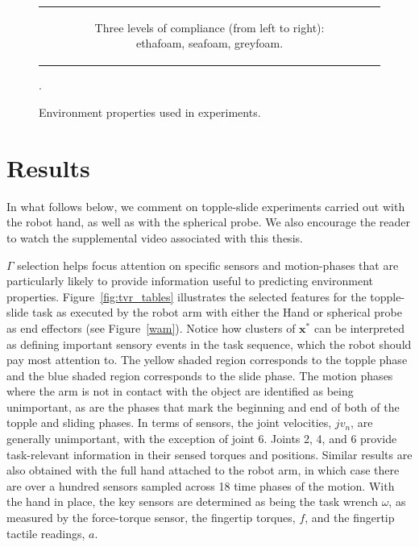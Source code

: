 \begin{figure}[]
\begin{tabular}{c}
\begin{subfigure}[]{1\linewidth}
            \caption{Three levels of compliance (from left to right): ethafoam, seafoam, greyfoam.}
        \end{subfigure}
    \end{tabular}
    \caption{Environment properties used in experiments.}.
    \label{fig:vis_properties}
\end{figure}

\section{Results}
In what follows below, we comment on topple-slide experiments carried out with the robot hand, as well as with the spherical probe.
We also encourage the reader to watch the supplemental video associated with this thesis.


$\Gamma$ selection helps focus attention on specific sensors and motion-phases that are particularly likely to provide information useful to predicting environment properties.
Figure~\ref{fig:tvr_tables} illustrates the selected features for the topple-slide task as executed by the robot arm with either the Hand or spherical probe as end effectors (see Figure~\ref{wam}).
Notice how clusters of $\mathbf{x}^*$ can be interpreted as defining important sensory events in the task sequence, which the robot should pay most attention to.
The yellow shaded region corresponds to the topple phase and the blue shaded region corresponds to the slide phase.
The motion phases where the arm is not in contact with the object are identified as being unimportant, as are the phases that mark the beginning and end of both of the topple and sliding phases.
In terms of sensors, the joint velocities, $jv_n$, are generally unimportant, with the exception of joint 6. 
Joints 2, 4, and 6 provide task-relevant information in their sensed torques and positions.
Similar results are also obtained with the full hand attached to the robot arm, in which case there are over a hundred sensors sampled across 18 time phases of the motion.
With the hand in place, the key sensors are determined as being the task wrench $\omega$, as measured by the force-torque sensor, the fingertip torques, $f$, and the fingertip tactile readings, $a$.

